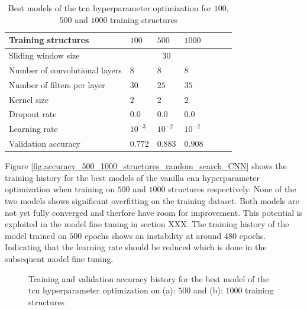 \documentclass[conference]{IEEEtran}
\begin{document}
\begin{table}[htp]
	\centering
	\caption{Best models of the \gls{tcn} hyperparameter optimization for $ 100 $, $ 500 $ and $ 1000 $ training structures}
	\label{tab:hyperparameters_100_500_1000_structures_TCN}
	\begin{tabular}{p{2.5cm}|llllll}
		Training structures & $ 100 $ & $ 500 $ & $ 1000 $ \\
		\hline
		Sliding window size & \multicolumn{3}{c}{$ 30 $} \\
		\hline
		Number of convolutional layers & $ 8 $ & $ 8 $ & $ 8 $ \\
		Number of filters per layer & $ 30 $ & $ 25 $ & $ 35 $ \\
		Kernel size & $ 2 $ & $ 2 $ & $ 2 $ \\
		Dropout rate & $ 0.0 $ & $ 0.0 $ & $ 0.0 $ \\
		Learning rate & $ 10^{-3} $ & $ 10^{-2} $ & $ 10^{-2} $ \\
		\hline
		Validation accuracy & $ 0.772 $ & $ 0.883 $ & $ 0.908 $
	\end{tabular}
\end{table}

Figure \ref{fig:accuracy_500_1000_structures_random_search_CNN} shows the training history for the best models of the vanilla \gls{cnn} hyperparameter optimization when training on $ 500 $ and $ 1000 $ structures respectively. None of the two models shows significant overfitting on the training dataset. Both models are not yet fully converged and therfore have room for improvement. This potential is exploited in the model fine tuning in section XXX. The training history of the model trained on $ 500 $ epochs shows an instability at around $ 480 $ epochs. Indicating that the learning rate should be reduced which is done in the subsequent model fine tuning.

\begin{figure}[htp]
	\centering
	\quad
	\caption{Training and validation accuracy history for the best model of the \gls{tcn} hyperparameter optimization on (a): $ 500 $ and (b): $ 1000 $ training structures}
	\label{fig:accuracy_500_1000_structures_random_search_TCN}
\end{figure}
\end{document}
